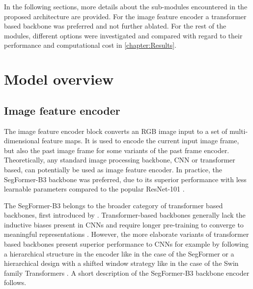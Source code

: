 In the following sections, more details about the sub-modules encountered in the proposed architecture are provided. For the image feature encoder a transformer based backbone was preferred and not further ablated. For the rest of the modules, different options were investigated and compared with regard to their performance and computational cost in \autoref{chapter:Results}.  \par


\section{Model overview}
\subsection{Image feature encoder}
The image feature encoder block converts an RGB image input to a set of multi-dimensional feature maps. It is used to encode the current input image frame, but also the past image frame for some variants of the past frame encoder. Theoretically, any standard image processing backbone, CNN or transformer based, can potentially be used as image feature encoder. In practice, the SegFormer-B3 \parencite{segformer} backbone was preferred, due to its superior performance with less learnable parameters compared to the popular ResNet-101 \parencite{resnet}. \par

The SegFormer-B3 belongs to the broader category of transformer based backbones, first introduced by \parencite{dosovitskiy2020vit}. Transformer-based backbones generally lack the inductive biases present in CNNs and require longer pre-training to converge to meaningful representations \parencite{dosovitskiy2020vit}. 
However, the more elaborate variants of transformer based backbones present superior performance to CNNs for example by following a hierarchical structure in the encoder like in the case of the SegFormer \parencite{segformer} or a hierarchical design with a shifted window strategy like in the case of the Swin family Transformers \parencite{swin}. 
A short description of the SegFormer-B3 backbone encoder follows.\par

